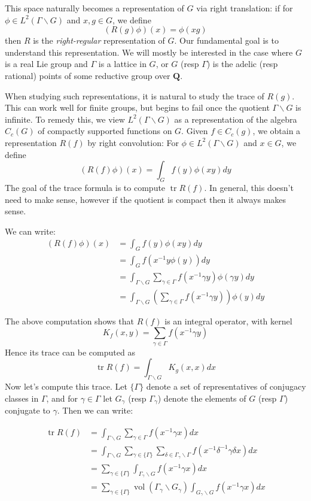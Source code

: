 \documentclass[leqno,12pt,a4paper, openany]{amsbook}
\theoremstyle{definition}
\numberwithin{equation}{section}
\newcommand{\BQ}{\mathbf{Q}}
\DeclareMathOperator{\tr}{tr}
\DeclareMathOperator{\vol}{vol}
\begin{document}
This space naturally becomes a representation of $G$ via right translation: if for $\phi \in L^2(\Gamma \backslash G)$ and $x, g \in G$, we define \[ (R(g) \phi)(x) = \phi(xg) \] then $R$ is the \emph{right-regular} representation of $G$. Our fundamental goal is to understand this representation. We will mostly be interested in the case where $G$ is a real Lie group and $\Gamma$ is a lattice in $G$, or $G$ (resp $\Gamma$) is the adelic (resp rational) points of some reductive 
group over $\BQ$. 

When studying such representations, it is natural to study the trace of $R(g)$. This can work well for finite groups, but begins to fail once the quotient $\Gamma \backslash G$ is infinite. To remedy this, we view $L^2(\Gamma \backslash G)$ as a representation of the 
algebra $C_c(G)$ of compactly supported functions on $G$. Given $f \in C_c(g)$, we obtain a representation $R(f)$ by right convolution: For $ \phi \in L^2(\Gamma \backslash G)$ and $x \in G$, we define \[ (R(f)\phi )(x) = \int_G f(y) \phi(xy) dy \] 
The goal of the trace formula is to compute $ \tr R(f)$. In general, this doesn't need to make sense, however if the quotient is compact then it always makes sense. 

We can write:
\begin{align*}
    (R(f) \phi)(x) &= \int_G f(y) \phi(xy) dy \\ 
    &= \int_G f(x^{-1}y \phi(y)) dy \\ 
    &= \int_{\Gamma \backslash G} \sum_{\gamma \in \Gamma} f(x^{-1} \gamma y) \phi(\gamma y) dy \\ 
    &= \int_{\Gamma \backslash G} \left( \sum_{\gamma \in \Gamma} f(x^{-1} \gamma y) \right) \phi(y) dy 
\end{align*}

The above computation shows that $R(f)$ is an integral operator, with kernel \[ K_f(x, y) = \sum_{\gamma \in \Gamma} f(x^{-1} \gamma y) \] Hence its trace can be computed as 
\[ \tr R(f) = \int_{\Gamma \backslash G} K_g(x, x) dx \] Now let's compute this trace. Let $\{ \Gamma \}$ denote a set of representatives of conjugacy classes in $\Gamma$, and for $\gamma \in \Gamma$ let $G_\gamma$ (resp $\Gamma_\gamma$) denote the elements of $G$ (resp $\Gamma$) conjugate to $\gamma$. Then we can write:

\begin{align*}
    \tr R(f) &= \int_{\Gamma \backslash G} \sum_{\gamma \in \Gamma} f(x^{-1} \gamma x ) dx \\ 
    &= \int_{\Gamma \backslash G} \sum_{\gamma \in \{\Gamma\}} \sum_{\delta \in \Gamma_\gamma \backslash \Gamma} f(x^{-1} \delta^{-1}\gamma \delta x ) dx \\ 
    &= \sum_{\gamma \in \{ \Gamma \}} \int_{\Gamma_\gamma \backslash G} f(x^{-1} \gamma x ) dx \\ 
    &= \sum_{\gamma \in \{ \Gamma\}} \vol (\Gamma_\gamma \backslash G_\gamma) \int_{G_\gamma \backslash G} f(x^{-1} \gamma x) dx 
\end{align*}
\end{document}
